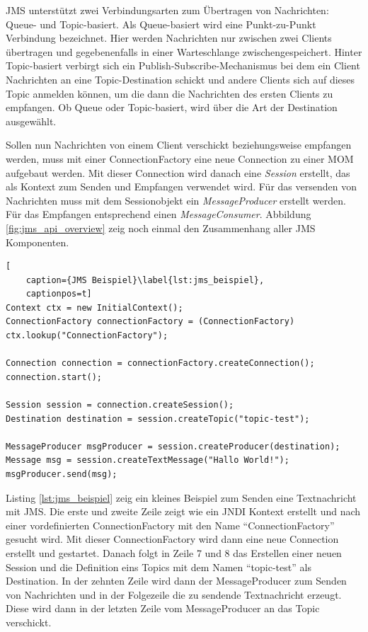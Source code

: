 JMS unterstützt zwei Verbindungsarten zum Übertragen von Nachrichten: Queue- und Topic-basiert. Als Queue-basiert wird eine Punkt-zu-Punkt Verbindung bezeichnet. Hier werden Nachrichten nur zwischen zwei Clients übertragen und gegebenenfalls in einer Warteschlange zwischengespeichert. Hinter Topic-basiert verbirgt sich ein Publish-Subscribe-Mechanismus bei dem ein Client Nachrichten an eine Topic-Destination schickt und andere Clients sich auf dieses Topic anmelden können, um die dann die Nachrichten des ersten Clients zu empfangen. Ob Queue oder Topic-basiert, wird über die Art der Destination ausgewählt.

Sollen nun Nachrichten von einem Client verschickt beziehungsweise empfangen werden, muss mit einer ConnectionFactory eine neue Connection zu einer MOM aufgebaut werden. Mit dieser Connection wird danach eine \emph{Session} erstellt, das als Kontext zum Senden und Empfangen verwendet wird. Für das versenden von Nachrichten muss mit dem Sessionobjekt ein \emph{MessageProducer} erstellt werden. Für das Empfangen entsprechend einen \emph{MessageConsumer}. Abbildung \ref{fig:jms_api_overview} zeig noch einmal den Zusammenhang aller JMS Komponenten.

\begin{lstlisting}[
    caption={JMS Beispiel}\label{lst:jms_beispiel},
    captionpos=t]
Context ctx = new InitialContext();
ConnectionFactory connectionFactory = (ConnectionFactory) ctx.lookup("ConnectionFactory");

Connection connection = connectionFactory.createConnection();
connection.start();

Session session = connection.createSession();
Destination destination = session.createTopic("topic-test");

MessageProducer msgProducer = session.createProducer(destination);
Message msg = session.createTextMessage("Hallo World!");
msgProducer.send(msg);
\end{lstlisting}

Listing \ref{lst:jms_beispiel} zeig ein kleines Beispiel zum Senden eine Textnachricht mit JMS. Die erste und zweite Zeile zeigt wie ein JNDI Kontext erstellt und nach einer vordefinierten ConnectionFactory mit den Name \enquote{ConnectionFactory} gesucht wird. Mit dieser ConnectionFactory wird dann eine neue Connection erstellt und gestartet. Danach folgt in Zeile 7 und 8 das Erstellen einer neuen Session und die Definition eins Topics mit dem Namen \enquote{topic-test} als Destination. In der zehnten Zeile wird dann der MessageProducer zum Senden von Nachrichten und in der Folgezeile die zu sendende Textnachricht erzeugt. Diese wird dann in der letzten Zeile vom MessageProducer an das Topic verschickt.

